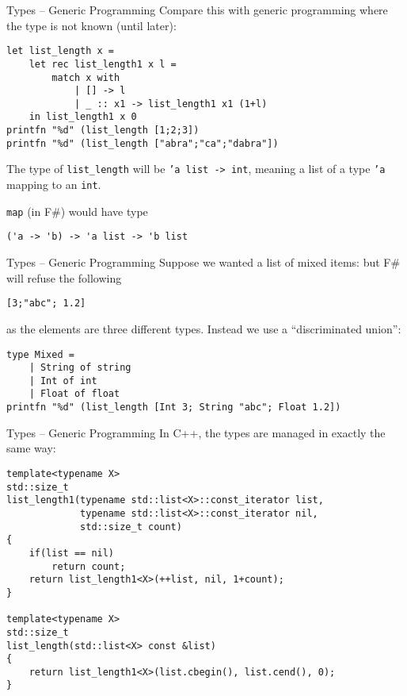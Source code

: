 \documentclass[presentation]{beamer}
\begin{document}
\begin{frame}[fragile]{Types -- Generic Programming}
  Compare this with generic programming where the type is not known (until later):
\begin{verbatim}
let list_length x =
    let rec list_length1 x l =
        match x with
            | [] -> l
            | _ :: x1 -> list_length1 x1 (1+l)
    in list_length1 x 0
printfn "%d" (list_length [1;2;3])
printfn "%d" (list_length ["abra";"ca";"dabra"])
\end{verbatim}
The type of \texttt{list\_length} will be \texttt{'a list -> int}, meaning a list of a type \texttt{'a} mapping to an \texttt{int}.

\medskip
\texttt{map} (in F\#) would have type
\begin{verbatim}
('a -> 'b) -> 'a list -> 'b list
\end{verbatim}

\end{frame}
\begin{frame}[fragile]{Types -- Generic Programming}
  Suppose we wanted a list of mixed items: but F\# will refuse the following
\begin{verbatim}
[3;"abc"; 1.2]
\end{verbatim}
as the elements are three different types.  Instead we use a ``discriminated union'':
\begin{verbatim}
type Mixed =
    | String of string
    | Int of int
    | Float of float
printfn "%d" (list_length [Int 3; String "abc"; Float 1.2])
\end{verbatim}
\end{frame}
\begin{frame}[fragile]{Types -- Generic Programming}
  In C++, the types are managed in exactly the same way:
\begin{verbatim}
template<typename X>
std::size_t
list_length1(typename std::list<X>::const_iterator list,
             typename std::list<X>::const_iterator nil,
             std::size_t count)
{
    if(list == nil)
        return count;
    return list_length1<X>(++list, nil, 1+count);
}

template<typename X>
std::size_t
list_length(std::list<X> const &list)
{
    return list_length1<X>(list.cbegin(), list.cend(), 0);
}
\end{verbatim}
\end{frame}
\end{document}
